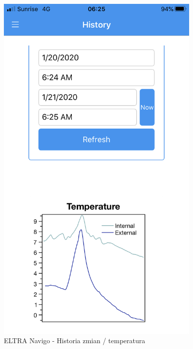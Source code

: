 \documentclass[a4paper,10pt]{article}
\begin{document}
\begin{figure}[H]
    \centering
    \begin{minipage}{0.45\textwidth}
        \centering
        \includegraphics[width=0.9\textwidth]{navigo_history1.png} %
        \caption{ELTRA Navigo - Historia zmian / temperatura}
        \label{rysunek_navigo_history_1}
    \end{minipage}\hfill
    \begin{minipage}{0.45\textwidth}
        \centering

\end{minipage}
\end{figure}
\end{document}

